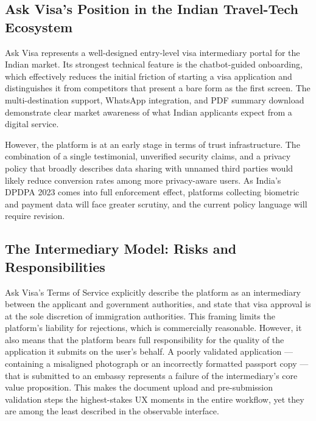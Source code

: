 \documentclass[journal, 10pt, twoside]{IEEEtran}
\begin{document}
\subsection{Ask Visa's Position in the Indian Travel-Tech Ecosystem}
Ask Visa represents a well-designed entry-level visa intermediary portal
for the Indian market. Its strongest technical feature is the chatbot-guided
onboarding, which effectively reduces the initial friction of starting a
visa application and distinguishes it from competitors that present a
bare form as the first screen. The multi-destination support, WhatsApp
integration, and PDF summary download demonstrate clear market awareness
of what Indian applicants expect from a digital service.

However, the platform is at an early stage in terms of trust infrastructure.
The combination of a single testimonial, unverified security claims, and a
privacy policy that broadly describes data sharing with unnamed third parties
would likely reduce conversion rates among more privacy-aware users. As
India's DPDPA 2023 comes into full enforcement effect, platforms collecting
biometric and payment data will face greater scrutiny, and the current
policy language will require revision.

\subsection{The Intermediary Model: Risks and Responsibilities}
Ask Visa's Terms of Service explicitly describe the platform as an
intermediary between the applicant and government authorities, and state
that visa approval is at the sole discretion of immigration authorities.
This framing limits the platform's liability for rejections, which is
commercially reasonable. However, it also means that the platform bears
full responsibility for the quality of the application it submits on the
user's behalf. A poorly validated application --- containing a misaligned
photograph or an incorrectly formatted passport copy --- that is submitted
to an embassy represents a failure of the intermediary's core value
proposition. This makes the document upload and pre-submission validation
steps the highest-stakes UX moments in the entire workflow, yet they
are among the least described in the observable interface.
\end{document}
